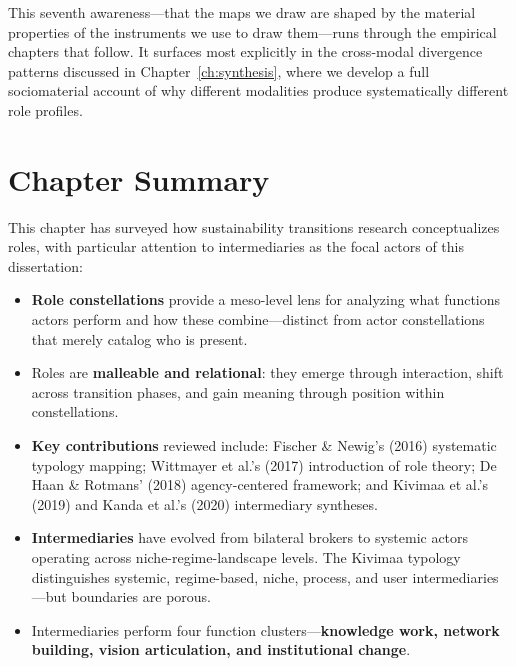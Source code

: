 \documentclass[../main.tex]{subfiles}
\begin{document}
This seventh awareness---that the maps we draw are shaped by the material properties of the instruments we use to draw them---runs through the empirical chapters that follow. It surfaces most explicitly in the cross-modal divergence patterns discussed in Chapter~\ref{ch:synthesis}, where we develop a full sociomaterial account of why different modalities produce systematically different role profiles.


\section{Chapter Summary}

\begin{summarybox}
This chapter has surveyed how sustainability transitions research conceptualizes roles, with particular attention to intermediaries as the focal actors of this dissertation:

\begin{itemize}[leftmargin=*, itemsep=0.3em]
\item \textbf{Role constellations} provide a meso-level lens for analyzing what functions actors perform and how these combine---distinct from actor constellations that merely catalog who is present.

\item Roles are \textbf{malleable and relational}: they emerge through interaction, shift across transition phases, and gain meaning through position within constellations.

\item \textbf{Key contributions} reviewed include: Fischer \& Newig's (2016) systematic typology mapping; Wittmayer et al.'s (2017) introduction of role theory; De Haan \& Rotmans' (2018) agency-centered framework; and Kivimaa et al.'s (2019) and Kanda et al.'s (2020) intermediary syntheses.

\item \textbf{Intermediaries} have evolved from bilateral brokers to systemic actors operating across niche-regime-landscape levels. The Kivimaa typology distinguishes systemic, regime-based, niche, process, and user intermediaries---but boundaries are porous.

\item Intermediaries perform four function clusters---\textbf{knowledge work, network building, vision articulation, and institutional change}.


\end{itemize}
\end{summarybox}
\end{document}

